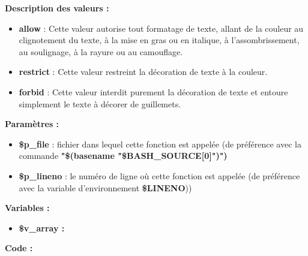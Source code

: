 \documentclass[a4paper,10pt]{article}
\begin{document}
\begin{justify}
    \textbf{Description des valeurs :}

    \begin{itemize}
        \item \textbf{allow} : Cette valeur autorise tout formatage de texte, allant de la couleur au clignotement du texte, à la mise en gras ou en italique, à l'assombrissement, au soulignage, à la rayure ou au camouflage.\\

        \item \textbf{restrict} : Cette valeur restreint la décoration de texte à la couleur.\\

        \item \textbf{forbid} : Cette valeur interdit purement la décoration de texte et entoure simplement le texte à décorer de guillemets.
    \end{itemize}

\end{justify}

\begin{justify}
    \textbf{Paramètres :}

    \begin{itemize}
        \item \color{orange}\textbf{\$p\_file}\color{white} : fichier dans lequel cette fonction est appelée (de préférence avec la commande \textbf{"\$(\color{gray}basename \color{white}"\color{orange}\$BASH\_SOURCE[0]\color{white}")")}\\

        \item \color{orange}\textbf{\$p\_lineno}\color{white} : le numéro de ligne où cette fonction est appelée (de préférence avec la variable d'environnement \textbf{\color{orange}\$LINENO}))
    \end{itemize}
\end{justify}

\begin{justify}
    \textbf{Variables :}

    \begin{itemize}
        \item \textbf{\color{orange}\$v\_array\color{white} :}
    \end{itemize}
\end{justify}

\begin{justify}
    \textbf{Code :}
\end{justify}
\end{document}

